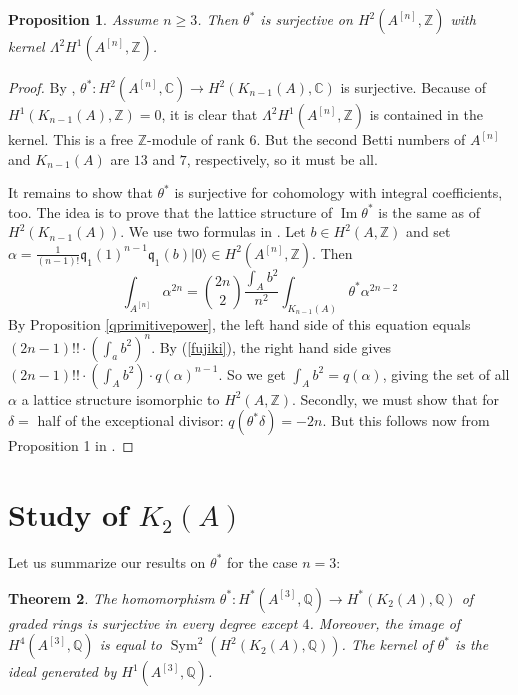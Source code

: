\documentclass{amsart}
\DeclareMathOperator{\im}{Im}
\DeclareMathOperator{\Sym}{Sym}
\newcommand{\hilb}[1]{^{[#1]}}
\newcommand{\vac}{|0\rangle}
\newcommand{\kum}[2]{K_{ #2 }( #1 )}
\newcommand{\C}{\mathbb{C}}
\newcommand{\Q}{\mathbb{Q}}
\newcommand{\Z}{\mathbb{Z}}
\newcommand{\kq}{\mathfrak{q}}
\theoremstyle{plain}
\newtheorem{theorem}{Theorem}[section]
\newtheorem{proposition}[theorem]{Proposition}
\theoremstyle{definition}
\theoremstyle{remark}
\begin{document}
\begin{proposition} Assume $n\geq 3$. Then
$\theta^*$ is surjective on $H^2(A\hilb{n},\Z)$ with kernel $\Lambda^2H^1(A\hilb{n},\Z)$.
\end{proposition}
\begin{proof}
By \cite[Sect.~7]{Beauville}, $\theta^{\ast} : H^2(A\hilb{n},\C) \rightarrow H^2(\kum{A}{n-1},\C)$ is surjective. Because of $H^1(\kum{A}{n-1},\Z)=0$, it is clear that $\Lambda^2H^1(A\hilb{n},\Z)$ is contained in the kernel. This is a free $\Z$-module of rank $6$. But the second Betti numbers of $A\hilb{n}$ and $\kum{A}{n-1}$ are $13$ and $7$, respectively, so it must be all.  

It remains to show that $\theta^*$ is surjective for cohomology with integral coefficients, too.
The idea is to prove that the lattice structure of $\im \theta^*$ is the same as of $H^2(\kum{A}{n-1})$.
We use two formulas in \cite[pp.~8--11]{Britze}. Let $b\in H^2(A,\Z)$ and set $\alpha = \frac{1}{(n-1)!}\kq_{1}(1)^{n-1}\kq_1(b)\vac\in H^2(A\hilb{n},\Z)$. Then  
\begin{equation} 
\int_{A\hilb{n}}\alpha^{2n} = \binom{2n}{2} \frac{\int_A b^2}{n^2} \int_{\kum{A}{n-1}} \theta^* \alpha^{2n-2}
\end{equation}
By Proposition \ref{qprimitivepower}, the left hand side of this equation equals $(2n-1)!!\cdot \left(\int_a b^2\right)^n$. By (\ref{fujiki}), the right hand side gives $(2n-1)!! \cdot \left(\int_A b^2\right) \cdot q(\alpha)^{n-1}$. So
we get
$\int_A b^2 = q(\alpha)$, giving the set of all $\alpha$ a lattice structure isomorphic to $H^2(A,\Z)$. 
Secondly, we must show that for $\delta=$ half of the exceptional divisor: $q(\theta^*\delta) = -2n$. But this follows now from Proposition 1 in \cite{Britze}.
\end{proof}



\section{Study of $\kum{A}{2}$}
Let us summarize our results on $\theta^*$ for the case $n=3$:
\begin{theorem}
The homomorphism $\theta^* : H^*(A\hilb{3},\Q)\rightarrow H^*(\kum{A}{2},\Q)$ of graded rings is surjective in every degree except $4$. Moreover, the image of $H^4(A\hilb{3},\Q)$ is equal to $\Sym^2(H^2(\kum{A}{2},\Q))$. 
The kernel of $\theta^*$ is the ideal generated by $H^1(A\hilb{3},\Q)$.
\end{theorem}
\end{document}
